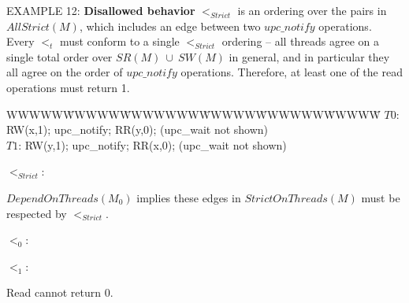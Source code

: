 \bigskip
\np EXAMPLE 12: \textbf{Disallowed behavior} 
$<_{Strict}$ is an ordering over the pairs in $AllStrict(M)$, which 
includes an edge between two $upc\_notify$ operations. Every $<_t$ must conform
to a single $<_{Strict}$ ordering -- all threads agree on a single total
order over $SR(M)\ \cup\ SW(M)$ in general, and in particular they all agree
on the order of $upc\_notify$ operations. Therefore, at least one of the
read operations must return 1.

\begin{tabbing}WWWWW\=WWWWW\=WWWWWWW\=WWWWW\=WWWWWW\=WWWWW\=\kill
$T0$: \> RW(x,1); \> upc\_notify; \> RR(y,0); \> (upc\_wait not shown)\\
$T1$: \> RW(y,1); \> upc\_notify; \> RR(x,0); \> (upc\_wait not shown)\\
\end{tabbing}

\bigskip
$<_{Strict}$:\\
\hspace{0.1in}
\parbox[t]{3in}
{$DependOnThreads(M_0)$ implies these edges in $StrictOnThreads(M)$ must be 
respected by $<_{Strict}$.\footnotemark}

\bigskip
$<_0$:\hspace{0.25in}
\hspace{0.4in}
\parbox[t]{2.5in}
{}

\bigskip
$<_1$:\hspace{0.25in}
\hspace{0.25in}
\parbox[t]{2in}
{ \vspace{0.5in} Read cannot return 0. }


